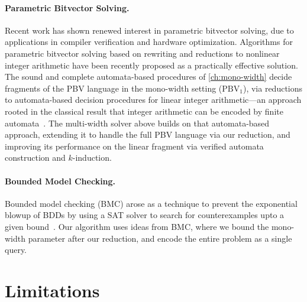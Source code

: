 \paragraph{Parametric Bitvector Solving.}
Recent work has shown renewed interest in parametric bitvector solving,
due to applications in compiler verification and hardware optimization.
Algorithms for parametric bitvector solving based on rewriting and reductions to nonlinear integer arithmetic \cite{bit-precise-parametric-bv} have been recently proposed
as a practically effective solution.
The sound and complete automata-based procedures of \cref{ch:mono-width}
decide fragments of the PBV language in the mono-width setting ($\text{PBV}_1$), via reductions
to automata-based decision procedures for linear integer arithmetic---an approach
rooted in the classical result that integer arithmetic can be encoded by finite
automata~\citep{Büchi1960}. The multi-width solver above builds on that
automata-based approach, extending it to handle the full PBV language via our
reduction, and improving its performance on the linear fragment via verified
automata construction and $k$-induction.

\paragraph{Bounded Model Checking.}
Bounded model checking (BMC) arose as a technique to prevent the exponential blowup of BDDs
by using a SAT solver to search for counterexamples upto a given bound~\cite{biere2009bounded}.
Our algorithm uses ideas from BMC, where we bound the mono-width parameter after our reduction, and encode the entire problem as a single \qfbv{} query.


\section{Limitations}
\label{sec:multi:limitations}

